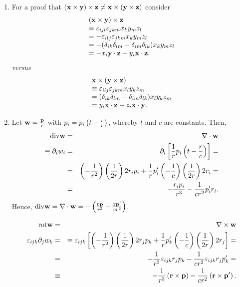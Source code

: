 {\begin{enumerate}
\item        For a proof that
$({{\bf x} } \times {{\bf y}})\times {{\bf z}}
\neq
{{\bf x} } \times ({{\bf y}}\times {{\bf z}})$ consider
\begin{equation}
\begin{array}{l}
({{\bf x} } \times {{\bf y}})\times {{\bf z}}\\
\equiv
\varepsilon_{ijl}
\varepsilon_{jkm}
x_k y_m z_l\\=
-\varepsilon_{ilj}
\varepsilon_{jkm}
x_k y_m z_l\\ =
-(\delta_{ik}\delta_{lm}-
\delta_{im}\delta_{lk})
x_k y_m z_l\\ =
-x_i {{\bf y}}\cdot {{\bf z}}+
y_i {{\bf x}}\cdot {{\bf z}}.
\end{array}
\end{equation}
{\it versus}
\begin{equation}
\begin{array}{l}{{\bf x} } \times ({{\bf y}}\times {{\bf z}})\\
\equiv
\varepsilon_{ilj}
\varepsilon_{jkm}
x_l y_k z_m\\ =
(\delta_{ik}\delta_{lm}-
\delta_{im}\delta_{lk})
x_l y_k z_m\\ =
y_i {{\bf x}}\cdot {{\bf z}}-
z_i {{\bf x}}\cdot {{\bf y}}.
\end{array}
\end{equation}





\item
Let ${\bf w} = { {{\bf p}} \over r} $ with  $p_i=p_i\left(t  - {r \over c}\right)$,
whereby   $t$ and $c$  are constants. Then,
\begin{eqnarray*}
  \mbox{div}{\bf w}& = &
\nabla \cdot {\bf w}\\
\equiv \partial_i w_i & = & \partial_i
  \left[
    \frac{1}{r} p_i \left(t-\frac{r}{c}\right)
  \right]= \\
  & = & \left(-\frac{1}{r^2}\right)\left(\frac{1}{2r}\right)
    2r_i p_i+
    \frac{1}{r}p_i'\left(-\frac{1}{c}\right)
    \left(\frac{1}{2r}\right)2 r_i= \\
  & = & -\frac{r_i p_i}{r^3}-\frac{1}{c r^2}p_i' r_i
.
\end{eqnarray*}
Hence,
$
  \mbox{div}{\bf w}=\nabla \cdot {\bf w}=
  -\left(\frac{{\bf r} {\bf p}}{r^3}+\frac{{\bf r} {\bf p}'}{c r^2}\right)
$.



\begin{eqnarray*}
\mbox{rot}{\bf w}& =& \nabla \times {\bf w}  \\
  \varepsilon_{ijk}\partial_j w_k & = &
   \equiv  \varepsilon_{ijk}
    \left[
      \left(-\frac{1}{r^2}\right)\left(\frac{1}{2r}\right)
      2 r_j p_k +
      \frac{1}{r}p_k'
      \left(-\frac{1}{c}\right)\left(\frac{1}{2r}\right)2r_j
    \right]= \\
  & = & -\frac{1}{r^3}\varepsilon_{ijk}r_j p_k -\frac{1}{cr^2}
    \varepsilon_{ijk}r_j p_k' = \\
  & \equiv & -\frac{1}{r^3}\left({\bf r} \times {\bf p}\right)-
    \frac{1}{cr^2}\left({\bf r} \times {\bf p}'\right)   .
\end{eqnarray*}


\end{enumerate}}
